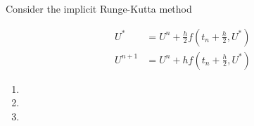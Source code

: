 Consider the implicit Runge-Kutta method

\begin{align*}
  U^* &= U^n + \frac{h}{2} f\left( t_n + \frac{h}{2}, U^* \right) \\
  U^{n+1} &= U^n + h f\left(t_n + \frac{h}{2}, U^* \right)
\end{align*}


\begin{enumerate}
  \item 
  \pagebreak
  \item 
  \pagebreak
  \item 
\end{enumerate} 